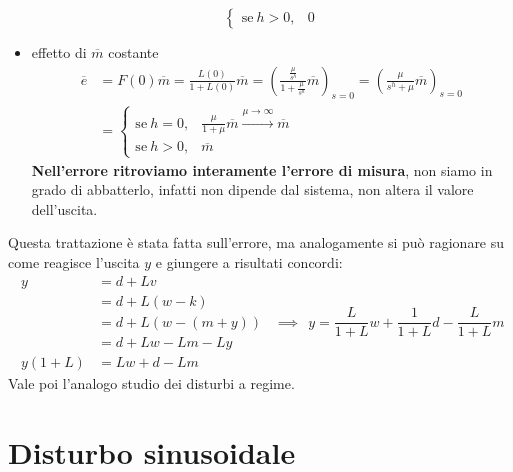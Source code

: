 \begin{itemize}
\begin{equation*}
\begin{cases}
	      \text{se} \ h >0, & 0
	\end{cases}
	\end{equation*}
	\item effetto di $\overline{m}$ costante\begin{equation*}
	      \begin{aligned}
	      	\overline{e}      & =F(0)\overline{m} =\frac{L(0)}{1+L(0)}\overline{m} =\left(\frac{\frac{\mu }{s^h}}{1+\frac{\mu }{s^h}}\overline{m}\right)_{s=0} =\left(\frac{\mu }{s^h +\mu }\overline{m}\right)_{s=0} \\
	      	                  & =\begin{cases}                                                                                                                                                                        
	      	\text{se} \ h=0,  & \frac{\mu }{1+\mu }\overline{m}\xrightarrow{\mu \to \infty }\overline{m}                                                                                                      \\
	      	\text{se} \ h >0, & \overline{m}                                                                                                                                                                          
	      	\end{cases}
	      \end{aligned}
	\end{equation*}\textbf{Nell'errore ritroviamo interamente l'errore di misura}, non siamo in grado di abbatterlo, infatti non dipende dal sistema, non altera il valore dell'uscita.
\end{itemize}

Questa trattazione è stata fatta sull'errore, ma analogamente si può ragionare su come reagisce l'uscita $y$ e giungere a risultati concordi:
\begin{equation*}
	\begin{aligned}
		y      & =d+Lv         \\
		       & =d+L(w-k)     \\
		       & =d+L(w-(m+y)) \\
		       & =d+Lw-Lm-Ly   \\
		y(1+L) & =Lw+d-Lm      
	\end{aligned} \ \ \implies \ \ \boxed{y=\frac{L}{1+L} w+\frac{1}{1+L} d-\frac{L}{1+L} m}
\end{equation*}
Vale poi l'analogo studio dei disturbi a regime.

\section{Disturbo sinusoidale}

